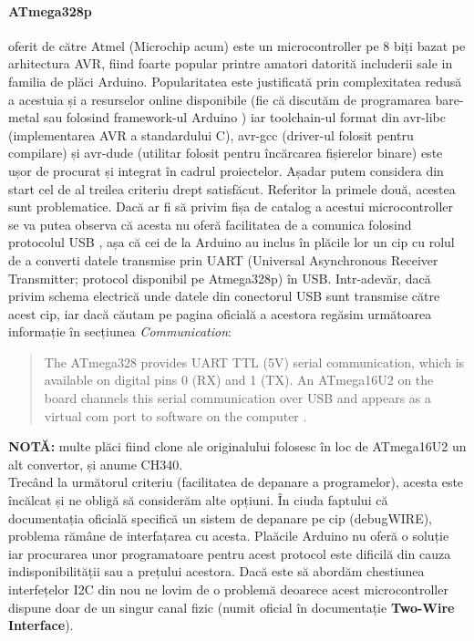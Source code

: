 \paragraph{ATmega328p} oferit de către Atmel (Microchip acum) este un microcontroller pe 8 biți bazat pe arhitectura AVR, fiind foarte popular printre amatori datorită includerii sale in familia de plăci Arduino. Popularitatea este justificată prin complexitatea redusă a acestuia și a resurselor online disponibile (fie că discutăm de programarea bare-metal sau folosind framework-ul Arduino \cite{arduino_docs}) iar toolchain-ul format din avr-libc (implementarea AVR a standardului C), avr-gcc (driver-ul folosit pentru compilare) și avr-dude (utilitar folosit pentru încărcarea fișierelor binare) este ușor de procurat și integrat în cadrul proiectelor. Așadar putem considera din start cel de al treilea criteriu drept satisfăcut. Referitor la primele două, acestea sunt problematice.
Dacă ar fi să privim fișa de catalog a acestui microcontroller se va putea observa că acesta nu oferă facilitatea de a comunica folosind protocolul USB \cite{atmega_datasheet}, așa că cei de la Arduino au inclus în plăcile lor un cip cu rolul de a converti datele transmise prin UART (Universal Asynchronous Receiver Transmitter; protocol disponibil pe Atmega328p) în USB. Intr-adevăr, dacă privim schema electrică unde datele din conectorul USB sunt transmise către acest cip, iar dacă căutam pe pagina oficială a acestora regăsim următoarea informație în secțiunea \textit{Communication}:
\begin{quote}
The ATmega328 provides UART TTL (5V) serial communication, which is available on digital pins 0 (RX) and 1 (TX). An ATmega16U2 on the board channels this serial communication over USB and appears as a virtual com port to software on the computer \cite{arduino_usb}.
\end{quote}
\textbf{NOTĂ:} multe plăci fiind clone ale originalului folosesc în loc de ATmega16U2 un alt convertor, și anume CH340. \\
Trecând la următorul criteriu (facilitatea de depanare a programelor), acesta este încălcat și ne obligă să considerăm alte opțiuni. În ciuda faptului că documentația oficială \cite{atmega_datasheet} specifică un sistem de depanare pe cip (debugWIRE), problema rămâne de interfațarea cu acesta. Plaăcile Arduino nu oferă o soluție iar procurarea unor programatoare pentru acest protocol este dificilă din cauza indisponibilității sau a prețului acestora. Dacă este să abordăm chestiunea interfețelor I2C din nou ne lovim de o problemă deoarece acest microcontroller dispune doar de un singur canal fizic (numit oficial în documentație \textbf{Two-Wire Interface}).

